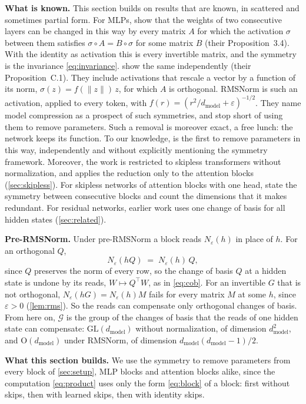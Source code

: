 \documentclass[10pt]{article}
\theoremstyle{definition}
\theoremstyle{remark}
\newcommand{\dm}{d_{\mathrm{model}}}
\newcommand{\GL}{\mathrm{GL}}
\newcommand{\Ort}{\mathrm{O}}
\newcommand{\G}{\mathcal{G}}
\newcommand{\norm}[1]{\lVert #1\rVert}
\newcommand{\para}[1]{\smallskip\noindent\textbf{#1}\hspace{0.5em}}
\begin{document}
\para{What is known.} This section builds on results that are known, in scattered and sometimes partial form. For MLPs, \citet{godfrey2022symmetries} show that the weights of two consecutive layers can be changed in this way by every matrix $A$ for which the activation $\sigma$ between them satisfies $\sigma \circ A = B \circ \sigma$ for some matrix $B$ (their Proposition~3.4). With the identity as activation this is every invertible matrix, and the symmetry is the invariance \eqref{eq:invariance}. \citet{zhao2023symmetries} show the same independently (their Proposition~C.1). They include activations that rescale a vector by a function of its norm, $\sigma(z) = f(\norm{z})\,z$, for which $A$ is orthogonal. RMSNorm is such an activation, applied to every token, with $f(r) = (r^2/\dm + \varepsilon)^{-1/2}$. They name model compression as a prospect of such symmetries, and stop short of using them to remove parameters. Such a removal is moreover exact, a free lunch: the network keeps its function. To our knowledge, \citet{graef2024tricks} is the first to remove parameters in this way, independently and without explicitly mentioning the symmetry framework. Moreover, the work is restricted to skipless transformers without normalization, and applies the reduction only to the attention blocks (\cref{sec:skipless}). For skipless networks of attention blocks with one head, \citet{henry2025lightning} state the symmetry between consecutive blocks and count the dimensions that it makes redundant. For residual networks, earlier work uses one change of basis for all hidden states (\cref{sec:related}).

\para{Pre-RMSNorm.} Under pre-RMSNorm a block reads $N_\varepsilon(h)$ in place of $h$. For an orthogonal $Q$,
\[
N_\varepsilon(hQ) \;=\; N_\varepsilon(h)\,Q ,
\]
since $Q$ preserves the norm of every row, so the change of basis $Q$ at a hidden state is undone by its reads, $W \mapsto Q^\top W$, as in \eqref{eq:cob}. For an invertible $G$ that is not orthogonal, $N_\varepsilon(hG) = N_\varepsilon(h)M$ fails for every matrix $M$ at some $h$, since $\varepsilon > 0$ (\cref{lem:rms}). So the reads can compensate only orthogonal changes of basis. From here on, $\G$ is the group of the changes of basis that the reads of one hidden state can compensate: $\GL(\dm)$ without normalization, of dimension $\dm^2$, and $\Ort(\dm)$ under RMSNorm, of dimension $\dm(\dm-1)/2$.

\para{What this section builds.} We use the symmetry to remove parameters from every block of \cref{sec:setup}, MLP blocks and attention blocks alike, since the computation \eqref{eq:product} uses only the form \eqref{eq:block} of a block: first without skips, then with learned skips, then with identity skips.
\end{document}
